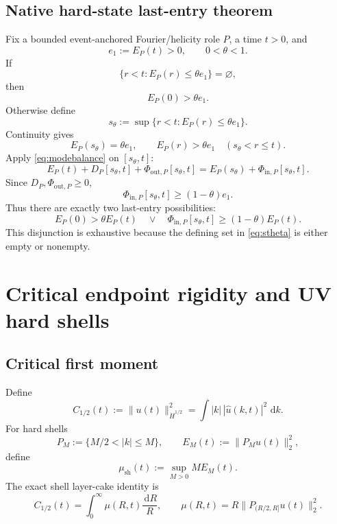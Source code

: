\documentclass[11pt]{article}
\newcommand{\dd}{\,\mathrm d}
\newcommand{\Hdot}{\dot H}
\begin{document}
\subsection{Native hard-state last-entry theorem}

Fix a bounded event-anchored Fourier/helicity role $P$, a time $t>0$, and
\[
e_1:=E_P(t)>0,
\qquad 0<\theta<1.
\]
If
\[
\{r<t:E_P(r)\le\theta e_1\}=\varnothing,
\]
then
\begin{equation}\label{eq:lastentryX}
E_P(0)>\theta e_1.
\end{equation}
Otherwise define
\begin{equation}\label{eq:stheta}
s_\theta
:=\sup\{r<t:E_P(r)\le\theta e_1\}.
\end{equation}
Continuity gives
\[
E_P(s_\theta)=\theta e_1,
\qquad
E_P(r)>\theta e_1
\quad (s_\theta<r\le t).
\]
Apply \eqref{eq:modebalance} on $[s_\theta,t]$:
\[
E_P(t)+D_P[s_\theta,t]+\Phi_{\mathrm{out},P}[s_\theta,t]
=E_P(s_\theta)+\Phi_{\mathrm{in},P}[s_\theta,t].
\]
Since $D_P,\Phi_{\mathrm{out},P}\ge0$,
\begin{equation}\label{eq:lastentryY}
\boxed{
\Phi_{\mathrm{in},P}[s_\theta,t]
\ge(1-\theta)e_1.
}
\end{equation}
Thus there are exactly two last-entry possibilities:
\begin{equation}\label{eq:lastentryalternative}
\boxed{
E_P(0)>\theta E_P(t)
\quad\vee\quad
\Phi_{\mathrm{in},P}[s_\theta,t]
\ge(1-\theta)E_P(t).
}
\end{equation}
This disjunction is exhaustive because the defining set in \eqref{eq:stheta} is either empty or nonempty.

\section{Critical endpoint rigidity and UV hard shells}

\subsection{Critical first moment}

Define
\begin{equation}\label{eq:C12}
C_{1/2}(t)
:=\|u(t)\|_{\Hdot^{1/2}}^2
=\int |k|\,|\widehat u(k,t)|^2\,\dd k.
\end{equation}
For hard shells
\[
P_M:=\{M/2<|k|\le M\},
\qquad
E_M(t):=\|P_Mu(t)\|_2^2,
\]
define
\begin{equation}\label{eq:mush}
\mu_{\mathrm{sh}}(t)
:=\sup_{M>0}M E_M(t).
\end{equation}
The exact shell layer-cake identity is
\begin{equation}\label{eq:layercake}
\boxed{
C_{1/2}(t)
=\int_0^\infty
\mu(R,t)\frac{\dd R}{R},
\qquad
\mu(R,t)=R\|P_{(R/2,R]}u(t)\|_2^2.
}
\end{equation}
\end{document}
